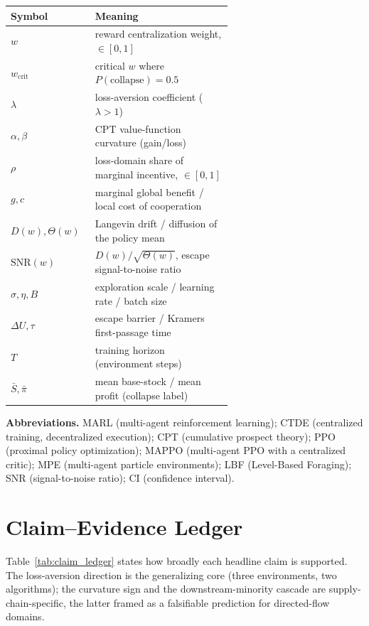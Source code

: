 \documentclass[letterpaper]{article} %
\theoremstyle{plain}
\newcommand{\wcrit}{w_{\mathrm{crit}}}
\begin{document}
\begin{table}[h]
\centering \small
\begin{tabular}{lp{0.62\linewidth}}
\toprule
Symbol & Meaning \\
\midrule
$w$ & reward centralization weight, $\in[0,1]$ \\
$\wcrit$ & critical $w$ where $P(\mathrm{collapse}){=}0.5$ \\
$\lambda$ & loss-aversion coefficient ($\lambda{>}1$) \\
$\alpha,\beta$ & CPT value-function curvature (gain/loss) \\
$\rho$ & loss-domain share of marginal incentive, $\in[0,1]$ \\
$g,c$ & marginal global benefit / local cost of cooperation \\
$D(w),\Theta(w)$ & Langevin drift / diffusion of the policy mean \\
$\mathrm{SNR}(w)$ & $D(w)/\sqrt{\Theta(w)}$, escape signal-to-noise ratio \\
$\sigma,\eta,B$ & exploration scale / learning rate / batch size \\
$\Delta U,\tau$ & escape barrier / Kramers first-passage time \\
$T$ & training horizon (environment steps) \\
$\bar S,\bar\pi$ & mean base-stock / mean profit (collapse label) \\
\bottomrule
\end{tabular}
\end{table}

\noindent\textbf{Abbreviations.} MARL (multi-agent reinforcement learning); CTDE (centralized
training, decentralized execution); CPT (cumulative prospect theory); PPO (proximal policy
optimization); MAPPO (multi-agent PPO with a centralized critic); MPE (multi-agent particle
environments); LBF (Level-Based Foraging); SNR (signal-to-noise ratio); CI (confidence
interval).

\section{Claim--Evidence Ledger}
\label{sec:s_ledger}

Table~\ref{tab:claim_ledger} states how broadly each headline claim is supported. The loss-aversion
direction is the generalizing core (three environments, two algorithms); the curvature sign and
the downstream-minority cascade are supply-chain-specific, the latter framed as a falsifiable
prediction for directed-flow domains.
\end{document}
